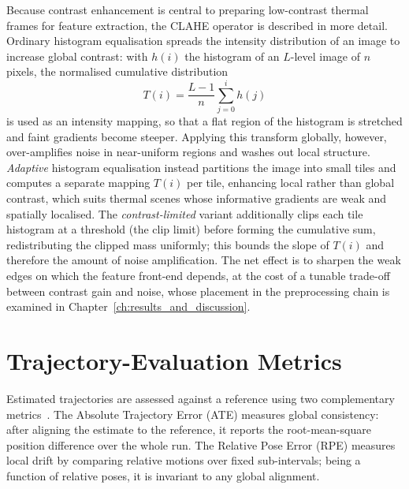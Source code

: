 Because contrast enhancement is central to preparing low-contrast thermal frames for feature extraction, the CLAHE operator is described in more detail. Ordinary histogram equalisation spreads the intensity distribution of an image to increase global contrast: with $h(i)$ the histogram of an $L$-level image of $n$ pixels, the normalised cumulative distribution
\begin{equation}
  T(i) = \frac{L-1}{n}\sum_{j=0}^{i} h(j)
\end{equation}
is used as an intensity mapping, so that a flat region of the histogram is stretched and faint gradients become steeper. Applying this transform globally, however, over-amplifies noise in near-uniform regions and washes out local structure. \emph{Adaptive} histogram equalisation instead partitions the image into small tiles and computes a separate mapping $T(i)$ per tile, enhancing local rather than global contrast, which suits thermal scenes whose informative gradients are weak and spatially localised. The \emph{contrast-limited} variant additionally clips each tile histogram at a threshold (the clip limit) before forming the cumulative sum, redistributing the clipped mass uniformly; this bounds the slope of $T(i)$ and therefore the amount of noise amplification. The net effect is to sharpen the weak edges on which the feature front-end depends, at the cost of a tunable trade-off between contrast gain and noise, whose placement in the preprocessing chain is examined in Chapter~\ref{ch:results_and_discussion}.

\section{Trajectory-Evaluation Metrics}
\label{sec:bg_metrics}
Estimated trajectories are assessed against a reference using two complementary metrics~\cite{Sturm_2012}. The Absolute Trajectory Error (ATE) measures global consistency: after aligning the estimate to the reference, it reports the root-mean-square position difference over the whole run. The Relative Pose Error (RPE) measures local drift by comparing relative motions over fixed sub-intervals; being a function of relative poses, it is invariant to any global alignment.

